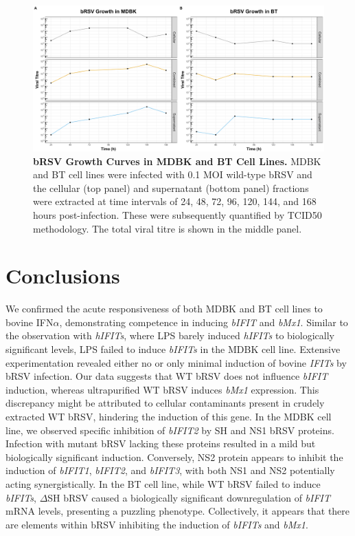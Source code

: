 \begin{figure}
    \centering
    \includegraphics[width=1\linewidth]{07. Chapter 2/Figs/01. Technologies/01. growth_curves.pdf}
    \caption[bRSV Growth Curves in MDBK and BT Cell Lines.]{\textbf{bRSV Growth Curves in MDBK and BT Cell Lines.} MDBK and BT cell lines were infected with 0.1 MOI wild-type bRSV and the cellular (top panel) and supernatant (bottom panel) fractions were extracted at time intervals of 24, 48, 72, 96, 120, 144, and 168 hours post-infection. These were subsequently quantified by TCID50 methodology. The total viral titre is shown in the middle panel.}
    \label{fig:bRSV growth curves in MDBK and BT cell lines}
\end{figure}



\section{Conclusions} \label{sec:Conclusions Chapter2}
We confirmed the acute responsiveness of both MDBK and BT cell lines to bovine IFN$\alpha$, demonstrating competence in inducing \textit{bIFIT} and \textit{bMx1}. Similar to the observation with \textit{hIFITs}, where LPS barely induced \textit{hIFITs} to biologically significant levels, LPS failed to induce \textit{bIFITs} in the MDBK cell line. Extensive experimentation revealed either no or only minimal induction of bovine \textit{IFITs} by bRSV infection. Our data suggests that WT bRSV does not influence \textit{bIFIT} induction, whereas ultrapurified WT bRSV induces \textit{bMx1} expression. This discrepancy might be attributed to cellular contaminants present in crudely extracted WT bRSV, hindering the induction of this gene. In the MDBK cell line, we observed specific inhibition of \textit{bIFIT2} by SH and NS1 bRSV proteins. Infection with mutant bRSV lacking these proteins resulted in a mild but biologically significant induction. Conversely, NS2 protein appears to inhibit the induction of \textit{bIFIT1}, \textit{bIFIT2}, and \textit{bIFIT3}, with both NS1 and NS2 potentially acting synergistically. In the BT cell line, while WT bRSV failed to induce \textit{bIFITs}, $\Delta$SH bRSV caused a biologically significant downregulation of \textit{bIFIT} mRNA levels, presenting a puzzling phenotype. Collectively, it appears that there are elements within bRSV inhibiting the induction of \textit{bIFITs} and \textit{bMx1}.

